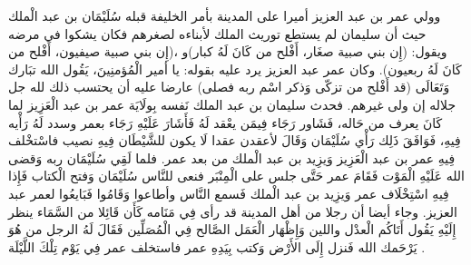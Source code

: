 وولي عمر بن عبد العزيز أميرا على المدينة بأمر الخليفة قبله سُلَيْمَان بن عبد الْملك حيث أن سليمان لم يستطع توريث الملك لأبناءه لصغرهم فكان يشكوا في مرضه ويقول: (إِن بني صبية صغَار، أَفْلح من كَانَ لَهُ كبار)و ،(إِن بني صبية صيفيون، أَفْلح من كَانَ لَهُ ربعيون). وكان عمر عبد العزيز يرد عليه بقوله: يا أمير الْمُؤمنِينَ، يَقُول الله تبَارك وَتَعَالَى (قد أَفْلح من تزكّى وَذكر اسْم ربه فصلى) عارضا عليه أن يحتسب ذلك لله جل جلاله إن ولى غيرهم. فحدث سليمان بن عبد الملك نَفسه بِولَايَة عمر بن عبد الْعَزِيز لما كَانَ يعرف من حَاله، فَشَاور رَجَاء فِيمَن يعْقد لَهُ فَأَشَارَ عَلَيْهِ رَجَاء بعمر وسدد لَهُ رَأْيه فِيهِ، فَوَافَقَ ذَلِك رَأْي سُلَيْمَان وَقَالَ لأعقدن عقدا لَا يكون للشَّيْطَان فِيهِ نصيب فاسْتخْلف فِيهِ عمر بن عبد الْعَزِيز وَيزِيد بن عبد الْملك من بعد عمر. فلما لَقِي سُلَيْمَان ربه وَقضى الله عَلَيْهِ الْمَوْت فَقَامَ عمر حَتَّى جلس على الْمِنْبَر فنعى للنَّاس سُلَيْمَان وَفتح الْكتاب فَإِذا فِيهِ اسْتِخْلَاف عمر وَيزِيد بن عبد الْملك فَسمع النَّاس وأطاعوا وَقَامُوا فَبَايعُوا لعمر عبد العزيز. وجاء أيضا أن رجلا من أهل المدينة قد رأى فِي مَنَامه كَأَن قَائِلا من السَّمَاء ينظر إِلَيْهِ يَقُول أَتَاكُم الْعدْل واللين وَإِظْهَار الْعَمَل الصَّالح فِي الْمُصَلِّين فَقَالَ لَهُ الرجل من هُوَ يَرْحَمك الله فَنزل إِلَى الأَرْض وَكتب بِيَدِهِ عمر فاستخلف عمر فِي يَوْم تِلْكَ اللَّيْلَة \cite{ibnAbdAlHakam_OmarIbnAbdAlAziz}.

